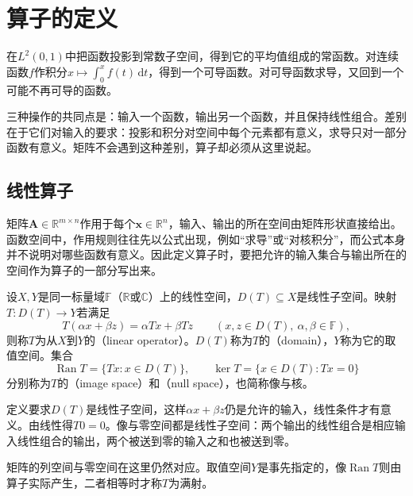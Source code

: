 \section{算子的定义}
\label{sec:lop-definition}

在$L^2(0,1)$中把函数投影到常数子空间，得到它的平均值组成的常函数。对连续函数$f$作积分$x\mapsto\int_0^xf(t)\,\mathrm dt$，得到一个可导函数。对可导函数求导，又回到一个可能不再可导的函数。

三种操作的共同点是：输入一个函数，输出另一个函数，并且保持线性组合。差别在于它们对输入的要求：投影和积分对空间中每个元素都有意义，求导只对一部分函数有意义。矩阵不会遇到这种差别，算子却必须从这里说起。

\subsection{线性算子}
\label{sec:lop-linear-operators}

矩阵$\bm A\in\mathbb R^{m\times n}$作用于每个$\bm x\in\mathbb R^n$，输入、输出的所在空间由矩阵形状直接给出。函数空间中，作用规则往往先以公式出现，例如“求导”或“对核积分”，而公式本身并不说明对哪些函数有意义。因此定义算子时，要把允许的输入集合与输出所在的空间作为算子的一部分写出来。

\begin{definition}[线性算子]
\label{def:lop-linear-operator}
设$X,Y$是同一标量域$\mathbb F$（$\mathbb R$或$\mathbb C$）上的线性空间，$D(T)\subseteq X$是线性子空间。映射$T:D(T)\to Y$若满足
\begin{equation}
 T(\alpha x+\beta z)=\alpha Tx+\beta Tz\qquad(x,z\in D(T),\ \alpha,\beta\in\mathbb F),
 \label{eq:lop-linearity}
\end{equation}
则称$T$为从$X$到$Y$的（linear operator）。$D(T)$称为$T$的（domain），$Y$称为它的取值空间。集合
\begin{equation}
 \operatorname{Ran}T=\{Tx:x\in D(T)\},\qquad\ker T=\{x\in D(T):Tx=0\}
 \label{eq:lop-range-null}
\end{equation}
分别称为$T$的（image space）和（null space），也简称像与核。
\end{definition}

定义要求$D(T)$是线性子空间，这样$\alpha x+\beta z$仍是允许的输入，线性条件才有意义。由线性得$T0=0$。像与零空间都是线性子空间：两个输出的线性组合是相应输入线性组合的输出，两个被送到零的输入之和也被送到零。

矩阵的列空间与零空间在这里仍然对应。取值空间$Y$是事先指定的，像$\operatorname{Ran}T$则由算子实际产生，二者相等时才称$T$为满射。

